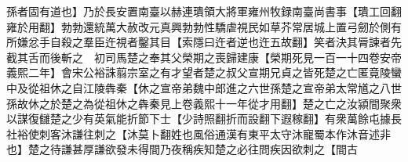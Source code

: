 孫者固有道也】乃於長安置南臺以赫連璝領大將軍雍州牧録南臺尚書事【璝工回翻雍於用翻】勃勃還統萬大赦改元真興勃勃性驕虐視民如草芥常居城上置弓劒於側有所嫌忿手自殺之羣臣迕視者鑿其目【索隱曰迕者逆也迕五故翻】笑者決其脣諫者先截其舌而後斬之　初司馬楚之奉其父榮期之喪歸建康【榮期死見一百一十四卷安帝義熙二年】會宋公裕誅翦宗室之有才望者楚之叔父宣期兄貞之皆死楚之亡匿竟陵蠻中及從祖休之自江陵犇秦【休之宣帝弟魏中郎進之六世孫楚之宣帝弟太常馗之八世孫故休之於楚之為從祖休之犇秦見上卷義熙十一年從才用翻】楚之亡之汝潁間聚衆以謀復讎楚之少有英氣能折節下士【少詩照翻折而設翻下遐稼翻】有衆萬餘屯據長社裕使刺客沐謙往刺之【沐莫卜翻姓也風俗通漢有東平太守沐寵蜀本作沐音述非也】楚之待謙甚厚謙欲發未得間乃夜稱疾知楚之必往問疾因欲刺之【間古